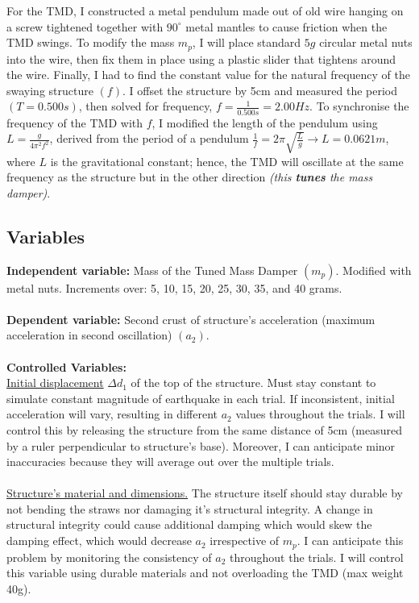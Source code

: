 \documentclass[11pt]{article}
\begin{document}
For the TMD, I constructed a metal pendulum made out of old wire hanging on a screw tightened together with $90^{\circ}$ metal mantles to cause friction when the TMD swings. To modify the mass $m_p$, I will place standard $5g$ circular metal nuts into the wire, then fix them in place using a plastic slider that tightens around the wire. Finally, I had to find the constant value for the natural frequency of the swaying structure $(f)$. I offset the structure by 5cm and measured the period $(T=0.500s)$, then solved for frequency,\phantom{.} $f=\frac{1}{0.500s}=2.00Hz$. To synchronise the frequency of the TMD with $f$, I modified the length of the pendulum using $L=\frac{g}{4\pi^2f^2}$, derived from the period of a pendulum $\frac{1}{f}=2\pi\sqrt{\frac{L}{g}} \rightarrow L=0.0621m$, where $L$ is the gravitational constant; hence, the TMD will oscillate at the same frequency as the structure but in the other direction \textit{(this \textbf{tunes} the mass damper)}.

\subsection{Variables}

\textbf{Independent variable: }
Mass of the Tuned Mass Damper $(m_p)$. Modified with metal nuts. Increments over: 5, 10, 15, 20, 25, 30, 35, and 40 grams.
\\ \\
\textbf{Dependent variable:}
Second crust of structure's acceleration (maximum acceleration in second oscillation) $(a_2)$.
\\ \\
\textbf{Controlled Variables:}
\\ \underline{Initial displacement} $\Delta d_1$ of the top of the structure. Must stay constant to simulate constant magnitude of earthquake in each trial. If inconsistent, initial acceleration will vary, resulting in different $a_2$ values throughout the trials. I will control this by releasing the structure from the same distance of 5cm (measured by a ruler perpendicular to structure's base). Moreover, I can anticipate minor inaccuracies because they will average out over the multiple trials.
\\ \\ \underline{Structure’s material and dimensions.} The structure itself should stay durable by not bending the straws nor damaging it's structural integrity. A change in structural integrity could cause additional damping which would skew the damping effect, which would decrease $a_2$ irrespective of $m_p$. I can anticipate this problem by monitoring the consistency of $a_2$ throughout the trials. I will control this variable using durable materials and not overloading the TMD (max weight 40g).
\end{document}
